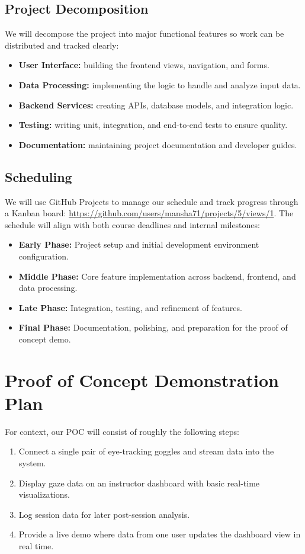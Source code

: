 \documentclass{article}
\begin{document}
\subsection*{Project Decomposition}
We will decompose the project into major functional features so work can be distributed and tracked clearly:
\begin{itemize}
  \item \textbf{User Interface:} building the frontend views, navigation, and forms.
  \item \textbf{Data Processing:} implementing the logic to handle and analyze input data.
  \item \textbf{Backend Services:} creating APIs, database models, and integration logic.
  \item \textbf{Testing:} writing unit, integration, and end-to-end tests to ensure quality.
  \item \textbf{Documentation:} maintaining project documentation and developer guides.
\end{itemize}

\subsection*{Scheduling}
We will use GitHub Projects to manage our schedule and track progress through a
Kanban board: \url{https://github.com/users/mansha71/projects/5/views/1}.  
The schedule will align with both course deadlines and internal milestones:
\begin{itemize}
  \item \textbf{Early Phase:} Project setup and initial development environment configuration.
  \item \textbf{Middle Phase:} Core feature implementation across backend, frontend, and data processing.
  \item \textbf{Late Phase:} Integration, testing, and refinement of features.
  \item \textbf{Final Phase:} Documentation, polishing, and preparation for the proof of concept demo.
\end{itemize}

\section{Proof of Concept Demonstration Plan}

For context, our POC will consist of roughly the following steps:
\begin{enumerate}
  \item Connect a single pair of eye-tracking goggles and stream data into the system.
  \item Display gaze data on an instructor dashboard with basic real-time visualizations.
  \item Log session data for later post-session analysis.
  \item Provide a live demo where data from one user updates the dashboard view in real time.
\end{enumerate}
\end{document}
